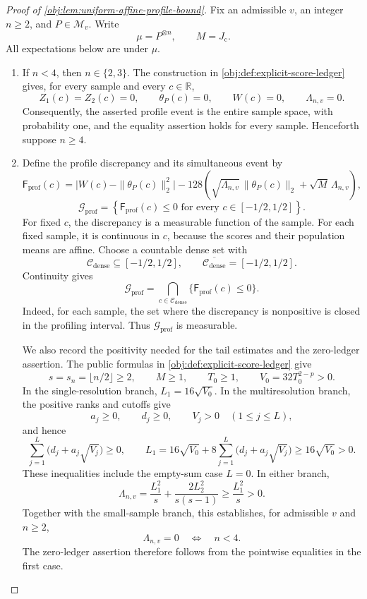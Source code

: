\documentclass[11pt]{article}
\begin{document}
\begin{proof}[Proof of \cref{obj:lem:uniform-affine-profile-bound}]
Fix an admissible \(v\), an integer \(n\ge2\), and \(P\in\mathcal M_v\). Write
\[
\mu=P^{\otimes n},
\qquad
M=J_{\mathrm c}.
\]
All expectations below are under \(\mu\).

\begin{enumerate}
\item
If \(n<4\), then \(n\in\{2,3\}\). The construction in \cref{obj:def:explicit-score-ledger} gives, for every sample and every \(c\in\mathbb R\),
\[
Z_1(c)=Z_2(c)=0,
\qquad
\theta_P(c)=0,
\qquad
W(c)=0,
\qquad
\Lambda_{n,v}=0.
\]
Consequently, the asserted profile event is the entire sample space, with probability one, and the equality assertion holds for every sample. Henceforth suppose \(n\ge4\).

\item
Define the profile discrepancy and its simultaneous event by
\[
\mathsf F_{\mathrm{prof}}(c)
=
\bigl|W(c)-\|\theta_P(c)\|_2^2\bigr|
-
128\left(
\sqrt{\Lambda_{n,v}}\,\|\theta_P(c)\|_2
+\sqrt M\,\Lambda_{n,v}
\right),
\]
\[
\mathcal G_{\mathrm{prof}}
=
\left\{
\mathsf F_{\mathrm{prof}}(c)\le0
\text{ for every }c\in[-1/2,1/2]
\right\}.
\]
For fixed \(c\), the discrepancy is a measurable function of the sample. For each fixed sample, it is continuous in \(c\), because the scores and their population means are affine. Choose a countable dense set with
\[
\mathcal C_{\mathrm{dense}}\subseteq[-1/2,1/2],
\qquad
\overline{\mathcal C_{\mathrm{dense}}}=[-1/2,1/2].
\]
Continuity gives
\[
\mathcal G_{\mathrm{prof}}
=
\bigcap_{c\in\mathcal C_{\mathrm{dense}}}
\{\mathsf F_{\mathrm{prof}}(c)\le0\}.
\]
Indeed, for each sample, the set where the discrepancy is nonpositive is closed in the profiling interval. Thus \(\mathcal G_{\mathrm{prof}}\) is measurable.

We also record the positivity needed for the tail estimates and the zero-ledger assertion. The public formulas in \cref{obj:def:explicit-score-ledger} give
\[
s=s_n=\lfloor n/2\rfloor\ge2,
\qquad
M\ge1,
\qquad
T_0\ge1,
\qquad
V_0=32T_0^{2-p}>0.
\]
In the single-resolution branch, \(L_1=16\sqrt{V_0}\). In the multiresolution branch, the positive ranks and cutoffs give
\[
a_j\ge0,\qquad d_j\ge0,\qquad V_j>0
\quad(1\le j\le L),
\]
and hence
\[
\sum_{j=1}^{L}\bigl(d_j+a_j\sqrt{V_j}\bigr)\ge0,
\qquad
L_1
=
16\sqrt{V_0}
+8\sum_{j=1}^{L}\bigl(d_j+a_j\sqrt{V_j}\bigr)
\ge16\sqrt{V_0}>0.
\]
These inequalities include the empty-sum case \(L=0\). In either branch,
\[
\Lambda_{n,v}
=
\frac{L_1^2}{s}+\frac{2L_2^2}{s(s-1)}
\ge\frac{L_1^2}{s}>0.
\]
Together with the small-sample branch, this establishes, for admissible \(v\) and \(n\ge2\),
\[
\Lambda_{n,v}=0
\quad\Longleftrightarrow\quad
n<4.
\]
The zero-ledger assertion therefore follows from the pointwise equalities in the first case.


\end{enumerate}
\end{proof}
\end{document}
